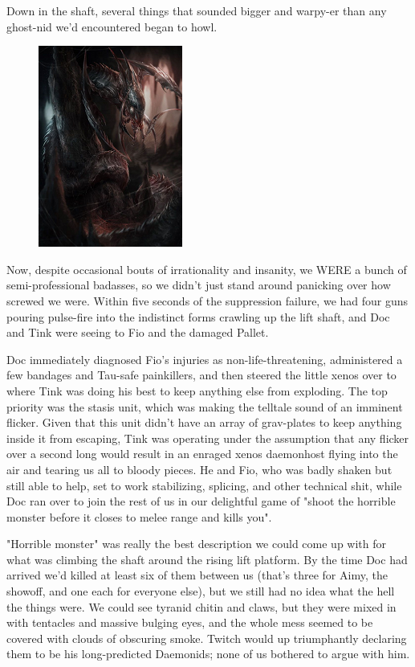 Down in the shaft, several things that sounded bigger and warpy-er than any ghost-nid we'd encountered began to howl.

\begin{figure}
	\begin{center}
		\includegraphics[width=\figwidth]{pics/15/64.png}
	\end{center}
\end{figure}
Now, despite occasional bouts of irrationality and insanity, we WERE a bunch of semi-professional badasses, so we didn't just stand around panicking over how screwed we were. 
Within five seconds of the suppression failure, we had four guns pouring pulse-fire into the indistinct forms crawling up the lift shaft, and Doc and Tink were seeing to Fio and the damaged Pallet.

Doc immediately diagnosed Fio's injuries as non-life-threatening, administered a few bandages and Tau-safe painkillers, and then steered the little xenos over to where Tink was doing his best to keep anything else from exploding. 
The top priority was the stasis unit, which was making the telltale sound of an imminent flicker. 
Given that this unit didn't have an array of grav-plates to keep anything inside it from escaping, Tink was operating under the assumption that any flicker over a second long would result in an enraged xenos daemonhost flying into the air and tearing us all to bloody pieces. 
He and Fio, who was badly shaken but still able to help, set to work stabilizing, splicing, and other technical shit, while Doc ran over to join the rest of us in our delightful game of "shoot the horrible monster before it closes to melee range and kills you".

"Horrible monster" was really the best description we could come up with for what was climbing the shaft around the rising lift platform. 
By the time Doc had arrived we'd killed at least six of them between us (that's three for Aimy, the showoff, and one each for everyone else), but we still had no idea what the hell the things were. 
We could see tyranid chitin and claws, but they were mixed in with tentacles and massive bulging eyes, and the whole mess seemed to be covered with clouds of obscuring smoke. 
Twitch would up triumphantly declaring them to be his long-predicted Daemonids; 
none of us bothered to argue with him.

